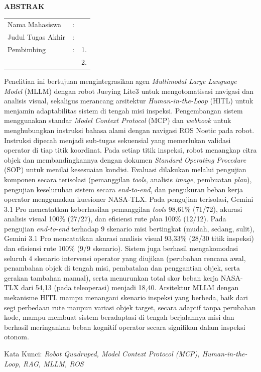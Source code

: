 \begin{center}
  \large\textbf{ABSTRAK}
\end{center}


\vspace{2ex}

\begingroup
\setlength{\tabcolsep}{0pt}

\noindent
\begin{tabularx}{\textwidth}{l >{\centering}m{2em} X}
  Nama Mahasiswa    & : & \name{}         \\

  Judul Tugas Akhir & : & \tatitle{}      \\

  Pembimbing        & : & 1. \advisor{}   \\
                    &   & 2. \coadvisor{} \\
\end{tabularx} 
\endgroup

Penelitian ini bertujuan mengintegrasikan agen \textit{Multimodal Large Language Model} (MLLM) dengan robot Jueying Lite3 untuk mengotomatisasi navigasi dan analisis visual, sekaligus merancang arsitektur \textit{Human-in-the-Loop} (HITL) untuk menjamin adaptabilitas sistem di tengah misi inspeksi. Pengembangan sistem menggunakan standar \textit{Model Context Protocol} (MCP) dan \textit{webhook} untuk menghubungkan instruksi bahasa alami dengan navigasi ROS Noetic pada robot. Instruksi dipecah menjadi sub-tugas sekuensial yang memerlukan validasi operator di tiap titik koordinat. Pada setiap titik inspeksi, robot menangkap citra objek dan membandingkannya dengan dokumen \textit{Standard Operating Procedure} (SOP) untuk menilai kesesuaian kondisi. Evaluasi dilakukan melalui pengujian komponen secara terisolasi (pemanggilan \textit{tools}, analisis \textit{image}, pembuatan \textit{plan}), pengujian keseluruhan sistem secara \textit{end-to-end}, dan pengukuran beban kerja operator menggunakan kuesioner NASA-TLX. Pada pengujian terisolasi, Gemini 3.1 Pro mencatatkan keberhasilan pemanggilan \textit{tools} 98,61\% (71/72), akurasi analisis visual 100\% (27/27), dan efisiensi rute \textit{plan} 100\% (12/12). Pada pengujian \textit{end-to-end} terhadap 9 skenario misi bertingkat (mudah, sedang, sulit), Gemini 3.1 Pro mencatatkan akurasi analisis visual 93,33\% (28/30 titik inspeksi) dan efisiensi rute 100\% (9/9 skenario). Sistem juga berhasil mengakomodasi seluruh 4 skenario intervensi operator yang diujikan (perubahan rencana awal, penambahan objek di tengah misi, pembatalan dan penggantian objek, serta gerakan tambahan manual), serta menurunkan total skor beban kerja NASA-TLX dari 54,13 (pada teleoperasi) menjadi 18,40. Arsitektur MLLM dengan mekanisme HITL mampu menangani skenario inspeksi yang berbeda, baik dari segi perbedaan rute maupun variasi objek target, secara adaptif tanpa perubahan kode, mampu membuat sistem beradaptasi di tengah berjalannya misi dan berhasil meringankan beban kognitif operator secara signifikan dalam inspeksi otonom.

Kata Kunci: \emph{Robot Quadruped, Model Context Protocol (MCP), Human-in-the-Loop, RAG, MLLM, ROS}

